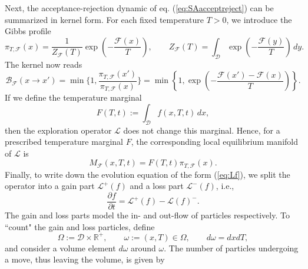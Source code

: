 \documentclass[10pt,a4paper]{article}
\theoremstyle{theorem}
\numberwithin{equation}{section}
\begin{document}
Next, the acceptance-rejection dynamic of eq. (\ref{eq:SAacceptreject}) can be summarized in kernel form. 
For each fixed temperature \(T>0\), we introduce the Gibbs profile
\begin{equation}
\pi_{T,\mathcal F}(x)
=
\frac{1}{Z_{\mathcal F}(T)}
\exp\left(-\frac{\mathcal F(x)}{T}\right),
\qquad
Z_{\mathcal F}(T)
=
\int_{\mathcal D}
\exp\left(-\frac{\mathcal F(y)}{T}\right)\,dy.
\label{eq:bg_prob}
\end{equation}
The kernel now reads 
\begin{equation}
\label{eq:SAkernel}
\mathcal{B}_\mathcal{F}(x\rightarrow x')=\min\Bigg\{1,\frac{\pi_{T,\mathcal F}(x')}{\pi_{T,\mathcal F}(x)}\Bigg\}=
\min\left\{
1,
\exp\left(-\frac{\mathcal F(x')-\mathcal F(x)}{T}\right)
\right\}.
\end{equation}
If we define the temperature marginal 
\begin{equation}
F(T,t):=\int_{\mathcal D}f(x,T,t)\,dx,
\label{eq:tmarginal}
\end{equation}
then the exploration operator \(\mathcal L\)
does not change this marginal. Hence, for a prescribed temperature marginal \(F\), the
corresponding local equilibrium manifold of \(\mathcal L\) is
\begin{equation}
M_{\mathcal F}(x,T,t)=F(T,t)\pi_{T,\mathcal F}(x).
\label{eq:equilibrium}
\end{equation}
Finally, to write down the evolution equation of the form (\ref{eq:Lf}), we split the operator into a gain part $\mathcal{L}^+(f)$ and a loss part $\mathcal{L}^-(f)$, i.e.,
\begin{equation}
\label{eq:Lfsplit}
\frac{\partial f}{\partial t}=\mathcal{L}^+(f)-\mathcal{L}(f)^-.
\end{equation}
The gain and loss parts model the in- and out-flow of particles respectively. To ``count" the gain and loss particles, define 
\[
\Omega:=\mathcal{D}\times \mathbb{R}^+,\qquad \omega := (x,T)\in \Omega,\qquad d\omega=dx dT,
\]
and consider a volume element $d\omega$ around $\omega$. The number of particles undergoing a move, thus leaving the volume, is given by 
\end{document}
